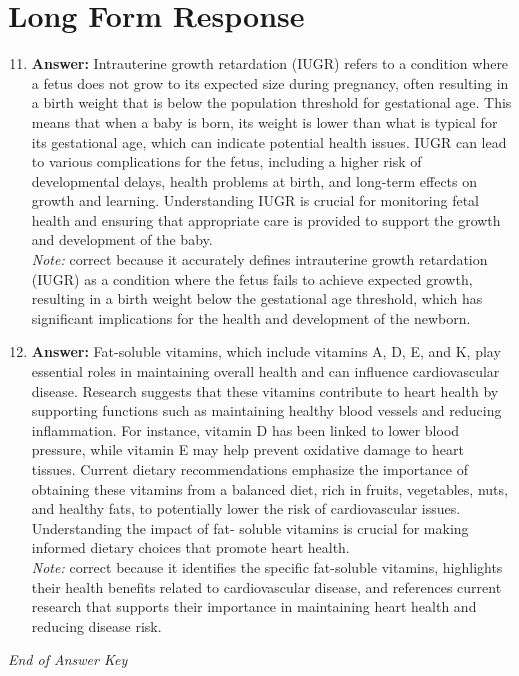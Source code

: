 \documentclass[12pt]{article}
\begin{document}
\section*{Long Form Response}
\begin{enumerate}[label=\arabic*.]
\setcounter{enumi}{10}
\item \textbf{Answer:} Intrauterine growth retardation (IUGR) refers to a condition where a fetus does not grow to its expected size during pregnancy, often resulting in a birth weight that is below the population threshold for gestational age. This means that when a baby is born, its weight is lower than what is typical for its gestational age, which can indicate potential health issues. IUGR can lead to various complications for the fetus, including a higher risk of developmental delays, health problems at birth, and long-term effects on growth and learning. Understanding IUGR is crucial for monitoring fetal health and ensuring that appropriate care is provided to support the growth and development of the baby.
\\ \textit{Note:} correct because it accurately defines intrauterine growth retardation (IUGR) as a condition where the fetus fails to achieve expected growth, resulting in a birth weight below the gestational age threshold, which has significant implications for the health and development of the newborn.
\item \textbf{Answer:} Fat-soluble vitamins, which include vitamins A, D, E, and K, play essential roles in maintaining overall health and can influence cardiovascular disease. Research suggests that these vitamins contribute to heart health by supporting functions such as maintaining healthy blood vessels and reducing inflammation. For instance, vitamin D has been linked to lower blood pressure, while vitamin E may help prevent oxidative damage to heart tissues. Current dietary recommendations emphasize the importance of obtaining these vitamins from a balanced diet, rich in fruits, vegetables, nuts, and healthy fats, to potentially lower the risk of cardiovascular issues. Understanding the impact of fat- soluble vitamins is crucial for making informed dietary choices that promote heart health.
\\ \textit{Note:} correct because it identifies the specific fat-soluble vitamins, highlights their health benefits related to cardiovascular disease, and references current research that supports their importance in maintaining heart health and reducing disease risk.
\end{enumerate}

\vfill
\noindent\textit{End of Answer Key}
\end{document}
